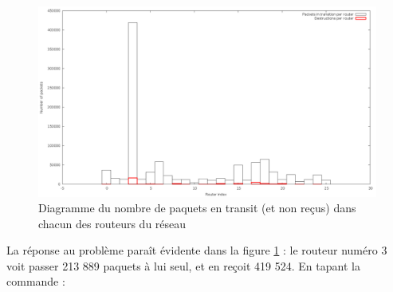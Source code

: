 \documentclass[
10pt, %
a4paper, %
oneside, %
headinclude,footinclude, %
BCOR5mm, %
]{scrartcl}
\begin{document}
\begin{figure}
	\centerfloat
    \includegraphics[width=19cm]{png/routers.png}
	\caption{Diagramme du nombre de paquets en transit (et non reçus) dans chacun des routeurs du réseau}
   \label{routers_charge}
\end{figure}

La réponse au problème paraît évidente dans la figure \ref{routers_charge} : le routeur numéro 3 voit passer 213 889 paquets à lui seul, et en reçoit 419 524.
En tapant la commande :
\end{document}
